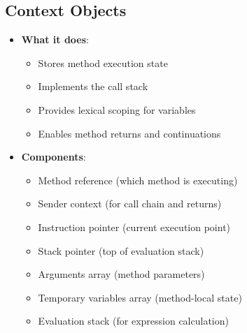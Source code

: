 \documentclass[12pt,a4paper]{report}
\begin{document}
\subsection{Context Objects}
\begin{itemize}
    \item \textbf{What it does}:
    \begin{itemize}
        \item Stores method execution state
        \item Implements the call stack
        \item Provides lexical scoping for variables
        \item Enables method returns and continuations
    \end{itemize}
    
    \item \textbf{Components}:
    \begin{itemize}
        \item Method reference (which method is executing)
        \item Sender context (for call chain and returns)
        \item Instruction pointer (current execution point)
        \item Stack pointer (top of evaluation stack)
        \item Arguments array (method parameters)
        \item Temporary variables array (method-local state)
        \item Evaluation stack (for expression calculation)
    \end{itemize}
\end{itemize}
\end{document}
